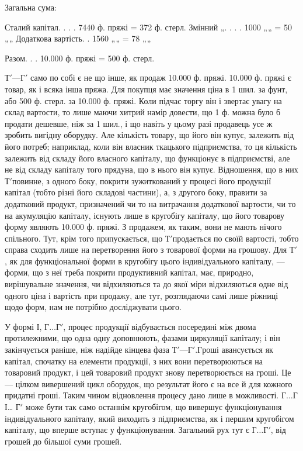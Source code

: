 \parcont{}  %
Загальна сума:

Сталий капітал.  .  .  .      7440 ф. пряжі = 372 ф. стерл.
Змінний „.  .  .  .      1000 „„ = 50 „„
Додаткова вартість.  .     1560 „„ = 78 „„

                      Разом. . .    10.000 ф. пряжі = 500 ф. стерл.

$Т' — Г'$ само по собі є не що інше, як продаж 10.000 ф. пряжі.
10.000    ф. пряжі є товар, як і всяка інша пряжа. Для покупця має значення
ціна в 1 шил. за фунт, або 500 ф. стерл. за 10.000 ф. пряжі. Коли
підчас торгу він і звертає увагу на склад вартости, то лише маючи
хитрий намір довести, що 1 ф. можна було б продати дешевше, ніж за
1 шил., і що навіть у цьому разі продавець усе ж зробить вигідну оборудку.
Але кількість товару, що його він купує, залежить від його
потреб; наприклад, коли він власник ткацького підприємства, то ця
кількість залежить від складу його власного капіталу, що функціонує в
підприємстві, але не від складу капіталу того прядуна, що в нього він
купує. Відношення, що в них $Т' п$овинне, з одного боку, покрити
зужиткований у процесі його продукції капітал (тобто різні його складові
частини), а, з другого боку, правити за додатковий продукт, призначений
чи то на витрачання додаткової вартости, чи то на акумуляцію капіталу,
існують лише в кругобігу капіталу, що його товарову форму являють
10.000 ф. пряжі. З продажем, як таким, вони не мають нічого спільного.
Тут, крім того припускається, що $Т' п$родається по своїй вартості, тобто
справа сходить лише на перетворення його з товарової форми на грошову.
Для $Т'$, як для функціональної форми в кругобігу цього індивідуального
капіталу, — форми, що з неї треба покрити продуктивний капітал, має,
природно, вирішувальне значення, чи відхиляються та до якої міри відхиляються
одне від одного ціна і вартість при продажу, але тут, розглядаючи
самі лише ріжниці щодо форм, нам не потрібно досліджувати
цього.

У формі І, $Г\dots{} Г'$, процес продукції відбувається посередині між двома
протилежними, що одна одну доповнюють, фазами циркуляції капіталу;
і він закінчується раніше, ніж надійде кінцева фаза $Т' — Г'. Г$роші авансується
як капітал, спочатку на елементи продукції, з них вони перетворюються
на товаровий продукт, і цей товаровий продукт знову перетворюється
на гроші. Це — цілком вивершений цикл оборудок, що результат
його є на все й для кожного придатні гроші. Таким чином відновлення
процесу дано лише в можливості. $Г\dots{} Г$І\dots{} $Г'$ може бути так само останнім
кругобігом, що вивершує функціонування індивідуального капіталу, який
виходить з підприємства, як і першим кругобігом капіталу, що вперше
вступає у функціонування. Загальний рух тут є $Г\dots{} Г'$, від грошей до більшої
суми грошей.

